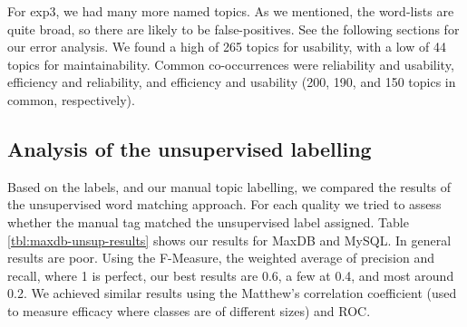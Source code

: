 \documentclass{acm_proc_article-sp}
\begin{document}
For \textsf{exp3}, we had many more named topics. As we mentioned, the word-lists are quite broad, so there are likely to be false-positives. See the following sections for our error analysis. We found a high of 265 topics for usability, with a low of 44 topics for maintainability. Common co-occurrences were reliability and usability, efficiency and reliability, and efficiency and usability (200, 190, and 150 topics in common, respectively). 

\subsection{Analysis of the unsupervised labelling}

\label{sec:unsuplabelling}

Based on the labels, and our manual topic labelling, we compared the results of the unsupervised word matching approach. For each quality we tried to assess whether the manual tag matched the unsupervised label assigned. Table \ref{tbl:maxdb-unsup-results} shows our results for MaxDB and MySQL. In general results are poor. Using the F-Measure, the weighted average of precision and recall, where 1 is perfect, our best results are 0.6, a few at 0.4, and most around 0.2. We achieved similar results using the Matthew's correlation coefficient (used to measure efficacy where classes are of different sizes) and ROC.  
\end{document}
